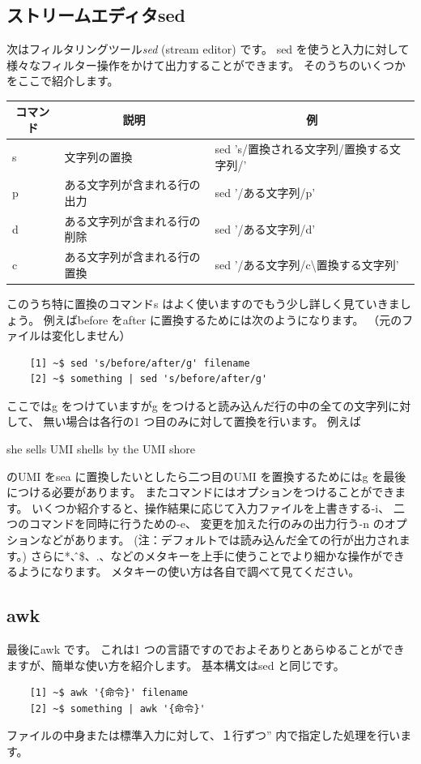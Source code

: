 \documentclass[a4j]{ltjsreport}
\begin{document}
    \subsection{ストリームエディタsed}
    次はフィルタリングツール\emph{sed} (stream editor) です。
    sed を使うと入力に対して様々なフィルター操作をかけて出力することができます。
    そのうちのいくつかをここで紹介します。
    \begin{longtable}[c]{|p{2cm}|p{6.5cm}|p{8cm}|}
        \hline
        \multicolumn{1}{|c|}{\textbf{コマンド}}&\multicolumn{1}{|c|}{\textbf{説明}}&\multicolumn{1}{|c|}{\textbf{例}}\\
        \hline\hline
        s &文字列の置換& sed 's/置換される文字列/置換する文字列/' \\
        \hline
        p &ある文字列が含まれる行の出力& sed '/ある文字列/p'\\
        \hline
        d &ある文字列が含まれる行の削除& sed '/ある文字列/d'\\
        \hline
        c &ある文字列が含まれる行の置換& sed '/ある文字列/c\textbackslash 置換する文字列'\\
        \hline
    \end{longtable}
    このうち特に置換のコマンドs はよく使いますのでもう少し詳しく見ていきましょう。
    例えばbefore をafter に置換するためには次のようになります。
    （元のファイルは変化しません）
    \begin{verbatim}
    [1] ~$ sed 's/before/after/g' filename
    [2] ~$ something | sed 's/before/after/g'
    \end{verbatim}
    ここではg をつけていますがg をつけると読み込んだ行の中の全ての文字列に対して、
    無い場合は各行の1 つ目のみに対して置換を行います。
    例えば
    \begin{center}
        she sells UMI shells by the UMI shore
    \end{center}
    のUMI をsea に置換したいとしたら二つ目のUMI を置換するためにはg を最後につける必要があります。
    またコマンドにはオプションをつけることができます。
    いくつか紹介すると、操作結果に応じて入力ファイルを上書きする-i、
    二つのコマンドを同時に行うための-e、
    変更を加えた行のみの出力行う-n のオプションなどがあります。
    (注：デフォルトでは読み込んだ全ての行が出力されます。) 
    さらに*、\^、\$、.、などのメタキーを上手に使うことでより細かな操作ができるようになります。
    メタキーの使い方は各自で調べて見てください。

    \subsection{awk}
    最後にawk です。
    これは1 つの言語ですのでおよそありとあらゆることができますが、簡単な使い方を紹介します。
    基本構文はsed と同じです。
    \begin{verbatim}
    [1] ~$ awk '{命令}' filename
    [2] ~$ something | awk '{命令}'
    \end{verbatim}
    ファイルの中身または標準入力に対して、１行ずつ'' 内で指定した処理を行います。
\end{document}
